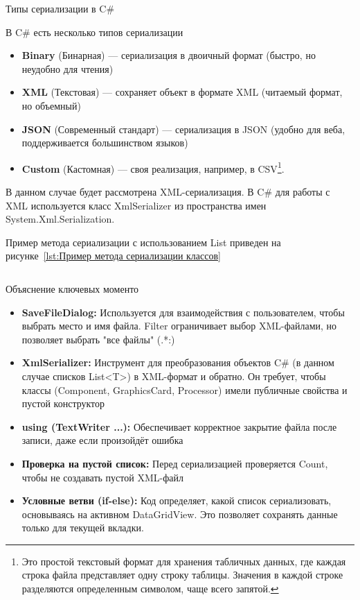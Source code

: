 \documentclass[12pt]{article}
\renewcommand{\texttt}[1]{{\small\ttfamily #1}}
\numberwithin{listing}{section}
\numberwithin{figure}{section}
\begin{document}
Типы сериализации в C\#

В C\# есть несколько типов сериализации
\begin{itemize}
	\item \textbf{Binary} (Бинарная) — сериализация в двоичный формат (быстро, но неудобно для чтения)
	\item \textbf{XML} (Текстовая) — сохраняет объект в формате XML (читаемый формат, но объемный)
	\item \textbf{JSON} (Современный стандарт) — сериализация в JSON (удобно для веба, поддерживается большинством языков)
	\item \textbf{Custom} (Кастомная) — своя реализация, например, в CSV\footnote{Это простой текстовый формат для хранения табличных данных, где каждая строка файла представляет одну строку таблицы. Значения в каждой строке разделяются определенным символом, чаще всего запятой.}.
\end{itemize}

В данном случае будет рассмотрена XML-сериализация. В C\# для работы с XML используется класс \texttt{XmlSerializer} из пространства имен \texttt{System.\-Xml.\-Serialization}.


Пример метода сериализации с использованием \texttt{List} приведен на рисунке~\ref{lst:Пример метода сериализации классов}

\inputminted[firstline = 531, lastline=598]{csharp}{../../2lab/WinFormsApp1example_/Form1.cs}
\label{lst:Пример метода сериализации классов}


Объяснение ключевых моменто
\begin{itemize}
	\item \textbf{\texttt{SaveFileDialog:}}
	      Используется для взаимодействия с пользователем, чтобы выбрать место и имя файла. Filter ограничивает выбор XML-файлами, но позволяет выбрать "все файлы" (\texttt{*.*:})
	\item \textbf{\texttt{XmlSerializer:}}
	      Инструмент для преобразования объектов C\# (в данном случае списков \texttt{List<T>}) в XML-формат и обратно. Он требует, чтобы классы (\texttt{Component, GraphicsCard, Processor}) имели публичные свойства и пустой конструктор
	\item \textbf{\texttt{using (TextWriter ...):}}
	      Обеспечивает корректное закрытие файла после записи, даже если произойдёт ошибка
	\item \textbf{\texttt{Проверка на пустой список:}}
	      Перед сериализацией проверяется \texttt{Count}, чтобы не создавать пустой XML-файл
	\item \textbf{\texttt{Условные ветви (if-else):}}
	      Код определяет, какой список сериализовать, основываясь на активном \texttt{DataGridView}. Это позволяет сохранять данные только для текущей вкладки.
\end{itemize}
\end{document}
